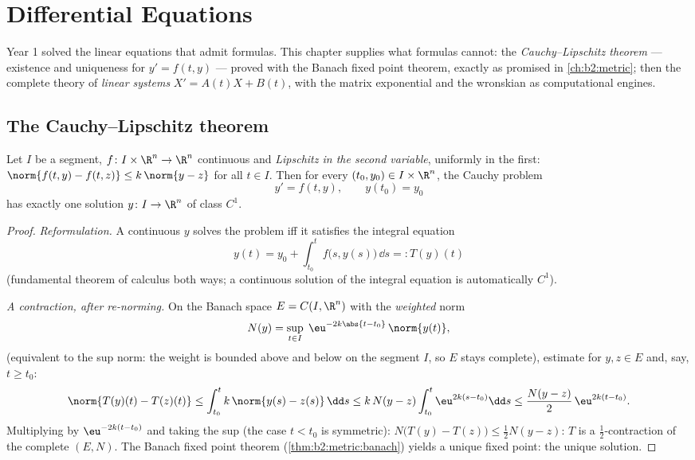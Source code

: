 \chapter{Differential Equations}\label{ch:b2:diffeq}

Year 1 solved the linear equations that admit formulas. This chapter
supplies what formulas cannot: the \emph{Cauchy--Lipschitz theorem}
--- existence and uniqueness for $y' = f(t, y)$ --- proved with the
Banach fixed point theorem, exactly as promised in
\cref{ch:b2:metric}; then the complete theory of \emph{linear
systems} $X' = A(t)X + B(t)$, with the matrix exponential and the
wronskian as computational engines.

\section{The Cauchy--Lipschitz theorem}

\begin{theorem}\label{thm:b2:diffeq:cauchylipschitz}
Let $I$ be a segment, $f \colon I \times \R^n \to \R^n$ continuous
and \emph{Lipschitz in the second variable}, uniformly in the
first: $\norm{f(t, y) - f(t, z)} \leq k\,\norm{y - z}$ for all $t
\in I$. Then for every $(t_0, y_0) \in I \times \R^n$, the Cauchy
problem
\[
y' = f(t, y), \qquad y(t_0) = y_0
\]
has exactly one solution $y \colon I \to \R^n$ of class $C^1$.
\end{theorem}

\begin{proof}
\emph{Reformulation.} A continuous $y$ solves the problem iff it
satisfies the integral equation
\[
y(t) = y_0 + \int_{t_0}^{t} f\bigl(s, y(s)\bigr)\,\dd s
=: T(y)(t)
\]
(fundamental theorem of calculus both ways; a continuous solution
of the integral equation is automatically $C^1$).

\emph{A contraction, after re-norming.} On the Banach space $E =
C(I, \R^n)$ with the \emph{weighted} norm
\[
N(y) = \sup_{t \in I}\; \eu^{-2k\abs{t - t_0}}\,\norm{y(t)} ,
\]
(equivalent to the sup norm: the weight is bounded above and below
on the segment $I$, so $E$ stays complete), estimate for $y, z \in
E$ and, say, $t \geq t_0$:
\[
\norm{T(y)(t) - T(z)(t)}
\leq \int_{t_0}^{t} k\,\norm{y(s) - z(s)}\,\dd s
\leq k\,N(y - z)\int_{t_0}^{t} \eu^{2k(s - t_0)}\dd s
\leq \frac{N(y-z)}{2}\,\eu^{2k(t - t_0)} .
\]
Multiplying by $\eu^{-2k(t - t_0)}$ and taking the sup (the case $t
< t_0$ is symmetric): $N\bigl(T(y) - T(z)\bigr) \leq \frac12 N(y -
z)$: $T$ is a $\frac12$-contraction of the complete $(E, N)$. The
Banach fixed point theorem (\cref{thm:b2:metric:banach}) yields a
unique fixed point: the unique solution.
\end{proof}

